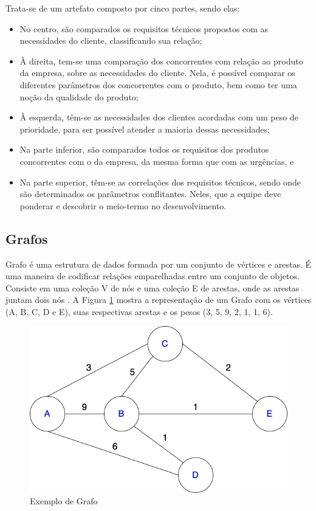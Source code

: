 Trata-se de um artefato composto por cinco partes, sendo elas:

\begin{itemize}
    \item No centro, são comparados os requisitos técnicos propostos com as necessidades do cliente, classificando sua relação;
    \item À direita, tem-se uma comparação dos concorrentes com relação ao produto da empresa, sobre as necessidades do cliente. Nela, é possível comparar os diferentes parâmetros dos concorrentes com o produto, bem como ter uma noção da qualidade do produto;
    \item À esquerda, têm-se as necessidades dos clientes acordadas com um peso de prioridade, para ser possível atender a maioria dessas necessidades;
    \item Na parte inferior, são comparados todos os requisitos dos produtos concorrentes com o da empresa, da mesma forma que com as urgências, e
    \item Na parte superior, têm-se as correlações dos requisitos técnicos, sendo onde são determinados os parâmetros conflitantes. Neles, que a equipe deve ponderar e descobrir o meio-termo no desenvolvimento.
\end{itemize}

\subsection{Grafos}

\label{sec:grafos}

Grafo é uma estrutura de dados formada por um conjunto de vértices e arestas. É uma maneira de codificar relações emparelhadas entre um conjunto de objetos. Consiste em uma coleção V de nós e uma coleção E de arestas, onde as arestas juntam dois nós \cite{Kleinberg+Tardos:06a}. A Figura \ref{grafo_1} mostra a representação de um Grafo com os vértices (A, B, C, D e E), suas respectivas arestas e os pesos (3, 5, 9, 2, 1, 1, 6).

\begin{figure}[H]
    \begin{center}
        \caption{Exemplo de Grafo}
        \label{grafo_1}
        \includegraphics[scale=0.5]{figuras/referencial_teorico/Grafo.drawio.png}
    \end{center}
\end{figure}

